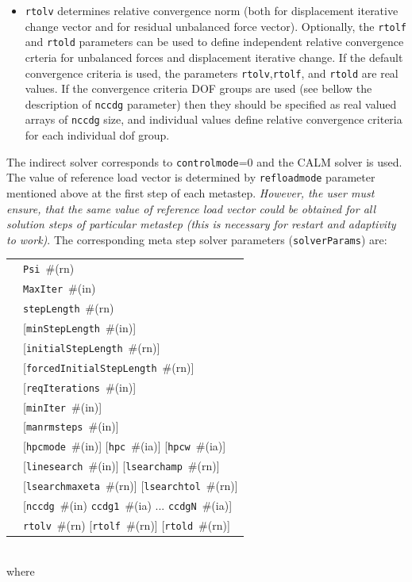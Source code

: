 \documentclass[a4paper]{article}
\makeatletter
\newcommand{\param}[1]{\texttt{#1}} %
\newcommand{\optional}[1]{[#1]} %
\newcommand{\field}[2]{\param{#1}~\#{\tiny(#2)}} %
\newcommand{\optField}[2]{\optional{\field{#1}{#2}}}
\newenvironment{record}[1][]{\begin{tabular}{|ll}}{\end{tabular}\\}
\newcommand{\recentry}[2]{{#1}&{#2}\\}
\newcounter{rcc}
\newenvironment{record}[1][\textwidth]{\setcounter{rcc}{0}\begin{tabular*}{#1}{|ll@{\extracolsep{\fill}}r}}{\end{tabular*}\\}
\newcommand{\recentry}[2]{\ifthenelse{\value{rcc}>0}{&$\backslash$ \\}{\setcounter{rcc}{1}}{#1}&{#2}}
\makeatother
\begin{document}
\begin{itemize}
\item \param{rtolv} determines relative convergence norm (both for displacement
iterative change vector and for residual unbalanced force vector). Optionally, the \param{rtolf} and \param{rtold} parameters can be used to define
independent relative convergence crteria for unbalanced forces and displacement
iterative change. If the default convergence criteria is used,
the parameters \param{rtolv},\param{rtolf}, and \param{rtold} are real values. If the convergence criteria DOF groups are used (see bellow the description of \param{nccdg} parameter) then they should be specified as real valued arrays of \param{nccdg} size, and individual values define relative convergence criteria for each individual dof group.
\end{itemize}

The indirect solver corresponds to \param{controlmode}=0 and the CALM
solver is used. The value of reference load vector is determined by
\param{refloadmode} parameter mentioned above at the first step of
each metastep. {\em However, the user must ensure, that the same value of
reference load vector could be obtained for all solution steps of
particular metastep (this is necessary for restart and adaptivity to work)}.
The corresponding meta step solver parameters (\param{solverParams}) are:\\
\begin{record}
  \recentry{\hspace{10mm}}{\field{Psi}{rn}}
  \recentry{}{\field{MaxIter}{in}}
  \recentry{}{\field{stepLength}{rn}}
  \recentry{}{\optField{min\-Step\-Le\-ngth}{in}}
  \recentry{}{\optField{initialStepLength}{rn}}
  \recentry{}{\optField{forcedInitialStepLength}{rn}}
  \recentry{}{\optField{reqIterations}{in}}
  \recentry{}{\optField{minIter}{in}}
  \recentry{}{\optField{manrmsteps}{in}}
  \recentry{}{\optField{hpcmode}{in} \optField{hpc}{ia} \optField{hpcw}{ia}}
  \recentry{}{\optField{linesearch}{in} \optField{lsearchamp}{rn}}
  \recentry{}{\optField{lsearchmaxeta}{rn} \optField{lsearchtol}{rn}}
  \recentry{}{\optional{\field{nccdg}{in} \field{ccdg1}{ia} ... \field{ccdgN}{ia}}}
  \recentry{}{\field{rtolv}{rn} \optField{rtolf}{rn} \optField{rtold}{rn}}
\end{record}
where
\end{document}
